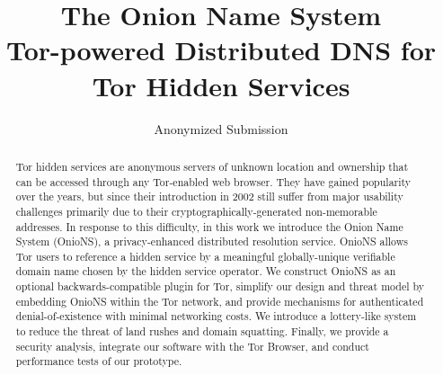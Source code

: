 \documentclass[USenglish,oneside,twocolumn]{article}
\begin{document}
\author[1]{Anonymized Submission}


\title{\huge The Onion Name System \large \\ Tor-powered Distributed DNS for Tor Hidden Services}

\begin{abstract} {
Tor hidden services are anonymous servers of unknown location and ownership that can be accessed through any Tor-enabled web browser. They have gained popularity over the years, but since their introduction in 2002 still suffer from major usability challenges primarily due to their cryptographically-generated non-memorable addresses. \newline \hspace*{1em} In response to this difficulty, in this work we introduce the Onion Name System (OnioNS), a privacy-enhanced distributed resolution service. OnioNS allows Tor users to reference a hidden service by a meaningful globally-unique verifiable domain name chosen by the hidden service operator. We construct OnioNS as an optional backwards-compatible plugin for Tor, simplify our design and threat model by embedding OnioNS within the Tor network, and provide mechanisms for authenticated denial-of-existence with minimal networking costs. We introduce a lottery-like system to reduce the threat of land rushes and domain squatting. Finally, we provide a security analysis, integrate our software with the Tor Browser, and conduct performance tests of our prototype.
}
\end{abstract}
  
\end{document}
